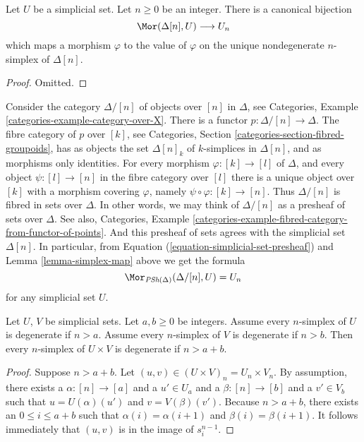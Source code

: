 \begin{lemma}
\label{lemma-simplex-map}
Let $U$ be a simplicial set. Let $n \geq 0$ be an integer.
There is a canonical bijection
$$
\Mor(\Delta[n], U)
\longrightarrow
U_n
$$
which maps a morphism $\varphi$ to the value of $\varphi$
on the unique nondegenerate $n$-simplex of $\Delta[n]$.
\end{lemma}

\begin{proof}
Omitted.
\end{proof}

\begin{example}
\label{example-simplex-category}
Consider the category $\Delta/[n]$ of objects over $[n]$
in $\Delta$, see
Categories, Example \ref{categories-example-category-over-X}.
There is a functor $p : \Delta/[n] \to \Delta$.
The fibre category of $p$ over $[k]$, see
Categories, Section \ref{categories-section-fibred-groupoids},
has as objects the
set $\Delta[n]_k$ of $k$-simplices in $\Delta[n]$, and as
morphisms only identities. For every morphism
$\varphi : [k] \to [l]$ of $\Delta$, and every object $\psi : [l] \to [n]$
in the fibre category over $[l]$ there is a unique
object over $[k]$ with a morphism covering $\varphi$, namely
$\psi \circ \varphi : [k] \to [n]$. Thus $\Delta/[n]$
is fibred in sets over $\Delta$. In other words, we may
think of $\Delta/[n]$ as a presheaf of sets over $\Delta$.
See also, Categories,
Example \ref{categories-example-fibred-category-from-functor-of-points}.
And this presheaf of sets agrees with the simplicial set
$\Delta[n]$. In particular, from Equation
(\ref{equation-simplicial-set-presheaf}) and
Lemma \ref{lemma-simplex-map} above
we get the formula
$$
\Mor_{\textit{PSh}(\Delta)}(\Delta/[n], U) = U_n
$$
for any simplicial set $U$.
\end{example}

\begin{lemma}
\label{lemma-product-degenerate}
Let $U$, $V$ be simplicial sets.
Let $a, b \geq 0$ be integers.
Assume every $n$-simplex of $U$ is degenerate if $n > a$.
Assume every $n$-simplex of $V$ is degenerate if $n > b$.
Then every $n$-simplex of $U \times V$ is degenerate
if $n > a + b$.
\end{lemma}

\begin{proof}
Suppose $n > a + b$. Let $(u, v) \in (U \times V)_n = U_n \times V_n$.
By assumption, there exists a $\alpha : [n] \to [a]$ and a
$u' \in U_a$ and a $\beta : [n] \to [b]$ and a $v' \in V_b$
such that $u = U(\alpha)(u')$ and $v = V(\beta)(v')$. Because
$n > a + b$, there exists an $0 \leq i \leq a + b$ such that
$\alpha(i) = \alpha(i + 1)$ and
$\beta(i) = \beta(i + 1)$. It follows immediately
that $(u, v)$ is in the image of $s^{n - 1}_i$.
\end{proof}







